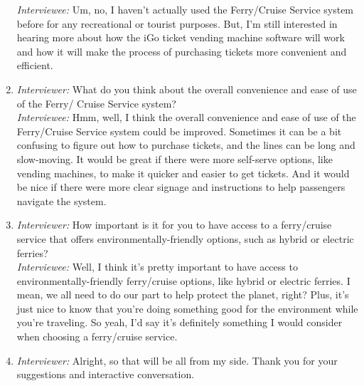 \begin{enumerate}
\emph{Interviewee:} Um, no, I haven't actually used the Ferry/Cruise Service system before for any recreational or tourist purposes. But, I'm still interested in hearing more about how the iGo ticket vending machine software will work and how it will make the process of purchasing tickets more convenient and efficient.
\item \emph{Interviewer:} What do you think about the overall convenience and ease of use of the Ferry/ Cruise Service system?\\
\emph{Interviewee:} Hmm, well, I think the overall convenience and ease of use of the Ferry/Cruise Service system could be improved. Sometimes it can be a bit confusing to figure out how to purchase tickets, and the lines can be long and slow-moving. It would be great if there were more self-serve options, like vending machines, to make it quicker and easier to get tickets. And it would be nice if there were more clear signage and instructions to help passengers navigate the system.
\item \emph{Interviewer:} How important is it for you to have access to a ferry/cruise service that offers environmentally-friendly options, such as hybrid or electric ferries?\\
\emph{Interviewee:} Well, I think it's pretty important to have access to environmentally-friendly ferry/cruise options, like hybrid or electric ferries. I mean, we all need to do our part to help protect the planet, right? Plus, it's just nice to know that you're doing something good for the environment while you're traveling. So yeah, I'd say it's definitely something I would consider when choosing a ferry/cruise service.
\item  \emph{Interviewer:} Alright, so that will be all from my side. Thank you for your suggestions and interactive conversation.
\end{enumerate}